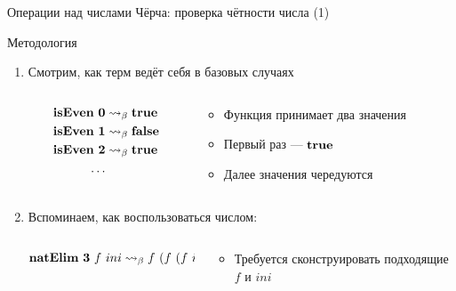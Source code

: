     \begin{frame}{Операции над числами Чёрча: проверка чётности числа (1)}
        \begin{block}{Методология}
            \begin{enumerate}
                \item Смотрим, как терм ведёт себя в базовых случаях
                \vspace{-1em}
                \begin{columns}[onlytextwidth]
                    \begin{column}[t]{0.46\textwidth}
                        \vspace{-0.5em}
                        \begin{align*}
                            \mathbf{isEven}~\mathbf{0}& \rightsquigarrow_\beta \mathbf{true} \\
                            \mathbf{isEven}~\mathbf{1}& \rightsquigarrow_\beta \mathbf{false} \\
                            \mathbf{isEven}~\mathbf{2}& \rightsquigarrow_\beta \mathbf{true} \\
                            \ldots
                        \end{align*}
                    \end{column}\hfill%
                    \begin{column}[t]{0.51\textwidth}
                        \begin{itemize}
                            \item Функция принимает два значения
                            \item Первый раз --- $\mathbf{true}$
                            \item Далее значения чередуются
                        \end{itemize}
                    \end{column}
                \end{columns}
                \item Вспоминаем, как воспользоваться числом:
                \begin{columns}[onlytextwidth]
                    \begin{column}{0.46\textwidth}
                        \[
                            \mathbf{natElim} ~ \mathbf{3} ~ f ~ ini \rightsquigarrow_{\beta} f ~ (f ~ (f ~ ini))
                        \]
                    \end{column}\hfill%
                    \begin{column}{0.51\textwidth}
                        \begin{itemize}
                            \item Требуется сконструировать подходящие $f$ и $ini$
                        \end{itemize}
                    \end{column}
                \end{columns}
            \end{enumerate}
        \end{block}
    \end{frame}

